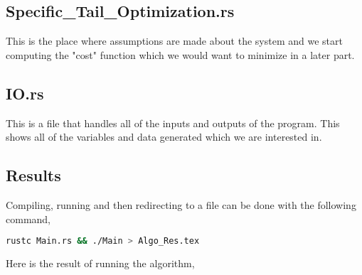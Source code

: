 \subsection{Specific\_Tail\_Optimization.rs}
\begin{comment}
\end{comment}
This is the place where assumptions are made about the system and we start computing the "cost" function which we would want to minimize in a later part.


\subsection{IO.rs}
\begin{comment}
\end{comment}
This is a file that handles all of the inputs and outputs of the program. This shows all of the variables and data generated which we are interested in.


\subsection{Results}
\begin{comment}
\end{comment}
Compiling, running and then redirecting to a file can be done with the following command,
\begin{lstlisting}[language=Bash]
rustc Main.rs && ./Main > Algo_Res.tex
\end{lstlisting}
$$$$
Here is the result of running the algorithm,


\begin{comment}
wing A
dcL/d alpha(deg) = 0.07339710144927537
x_np = 0.232* chord length
x_np = 0.08249920000000001m
cM = -0.13048
\end{comment}

\begin{comment}
c_M vs alpha at center of mass
xplot
range of cg values not a plot just the exist
\end{comment}
